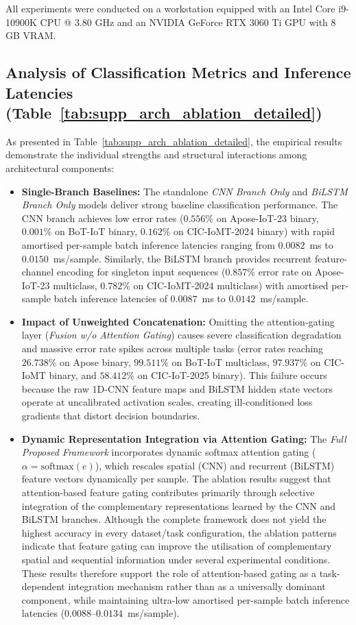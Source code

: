 \documentclass[a4paper,fleqn]{cas-sc}
\begin{document}
All experiments were conducted on a workstation equipped with an Intel Core i9-10900K CPU @ 3.80 GHz and an NVIDIA GeForce RTX 3060 Ti GPU with 8 GB VRAM.

\subsection{Analysis of Classification Metrics and Inference Latencies (Table~\ref{tab:supp_arch_ablation_detailed})}

As presented in Table~\ref{tab:supp_arch_ablation_detailed}, the empirical results demonstrate the individual strengths and structural interactions among architectural components:
\begin{itemize}
    \item \textbf{Single-Branch Baselines:} The standalone \textit{CNN Branch Only} and \textit{BiLSTM Branch Only} models deliver strong baseline classification performance. The CNN branch achieves low error rates ($0.556\%$ on Apose-IoT-23 binary, $0.001\%$ on BoT-IoT binary, $0.162\%$ on CIC-IoMT-2024 binary) with rapid amortised per-sample batch inference latencies ranging from $0.0082$~ms to $0.0150$~ms/sample. Similarly, the BiLSTM branch provides recurrent feature-channel encoding for singleton input sequences ($0.857\%$ error rate on Apose-IoT-23 multiclass, $0.782\%$ on CIC-IoMT-2024 multiclass) with amortised per-sample batch inference latencies of $0.0087$~ms to $0.0142$~ms/sample.
    \item \textbf{Impact of Unweighted Concatenation:} Omitting the attention-gating layer (\textit{Fusion w/o Attention Gating}) causes severe classification degradation and massive error rate spikes across multiple tasks (error rates reaching $26.738\%$ on Apose binary, $99.511\%$ on BoT-IoT multiclass, $97.937\%$ on CIC-IoMT binary, and $58.412\%$ on CIC-IoT-2025 binary). This failure occurs because the raw 1D-CNN feature maps and BiLSTM hidden state vectors operate at uncalibrated activation scales, creating ill-conditioned loss gradients that distort decision boundaries.
    \item \textbf{Dynamic Representation Integration via Attention Gating:} The \textit{Full Proposed Framework} incorporates dynamic softmax attention gating ($\alpha = \text{softmax}(e)$), which rescales spatial (CNN) and recurrent (BiLSTM) feature vectors dynamically per sample. The ablation results suggest that attention-based feature gating contributes primarily through selective integration of the complementary representations learned by the CNN and BiLSTM branches. Although the complete framework does not yield the highest accuracy in every dataset/task configuration, the ablation patterns indicate that feature gating can improve the utilisation of complementary spatial and sequential information under several experimental conditions. These results therefore support the role of attention-based gating as a task-dependent integration mechanism rather than as a universally dominant component, while maintaining ultra-low amortised per-sample batch inference latencies ($0.0088$--$0.0134$~ms/sample).
\end{itemize}
\end{document}
